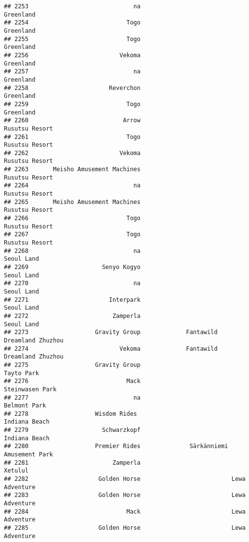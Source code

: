 \documentclass[
]{article}
\begin{document}
\begin{verbatim}
## 2253                              na                               Greenland
## 2254                            Togo                               Greenland
## 2255                            Togo                               Greenland
## 2256                          Vekoma                               Greenland
## 2257                              na                               Greenland
## 2258                       Reverchon                               Greenland
## 2259                            Togo                               Greenland
## 2260                           Arrow                          Rusutsu Resort
## 2261                            Togo                          Rusutsu Resort
## 2262                          Vekoma                          Rusutsu Resort
## 2263       Meisho Amusement Machines                          Rusutsu Resort
## 2264                              na                          Rusutsu Resort
## 2265       Meisho Amusement Machines                          Rusutsu Resort
## 2266                            Togo                          Rusutsu Resort
## 2267                            Togo                          Rusutsu Resort
## 2268                              na                              Seoul Land
## 2269                     Senyo Kogyo                              Seoul Land
## 2270                              na                              Seoul Land
## 2271                       Interpark                              Seoul Land
## 2272                        Zamperla                              Seoul Land
## 2273                   Gravity Group             Fantawild Dreamland Zhuzhou
## 2274                          Vekoma             Fantawild Dreamland Zhuzhou
## 2275                   Gravity Group                              Tayto Park
## 2276                            Mack                         Steinwasen Park
## 2277                              na                            Belmont Park
## 2278                   Wisdom Rides                            Indiana Beach
## 2279                     Schwarzkopf                           Indiana Beach
## 2280                   Premier Rides              Särkänniemi Amusement Park
## 2281                        Zamperla                                 Xetulul
## 2282                    Golden Horse                          Lewa Adventure
## 2283                    Golden Horse                          Lewa Adventure
## 2284                            Mack                          Lewa Adventure
## 2285                    Golden Horse                          Lewa Adventure

\end{verbatim}
\end{document}
